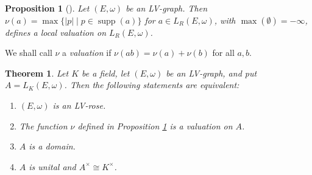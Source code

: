 \documentclass{article}
\newtheorem{theorem}{Theorem}
\newtheorem{proposition}{Proposition}
\theoremstyle{definition}
\begin{document}
\begin{proposition}[{\cite[Proposition 40]{HaP}}]\label{prop:local-valuation}
Let $(E,\omega)$ be an LV-graph. Then $\nu(a)=\max\{|p|\mid p\in \operatorname{supp}(a)\}$ for $a\in L_R(E,\omega)$,
with $\max(\emptyset)=-\infty$, defines a local valuation on $L_R(E,\omega)$.
\end{proposition}

We shall call $\nu$ a \textit{valuation}
if $\nu(ab)=\nu(a)+\nu(b)$ for all $a,b$.

\begin{theorem}\label{thm:equiv-units-lv-domain}
Let $K$ be a field, let $(E,\omega)$ be an LV-graph, and put
$A=L_K(E,\omega)$. Then the following statements are equivalent:
\begin{enumerate}[label=\textup{(\arabic*)}]
\item $(E,\omega)$ is an LV-rose.
\item The function $\nu$ defined in Proposition \ref{prop:local-valuation} is a valuation on $A$.
\item $A$ is a domain.
\item $A$ is unital and $A^\times \cong K^\times$.
\end{enumerate}
\end{theorem}
\end{document}
